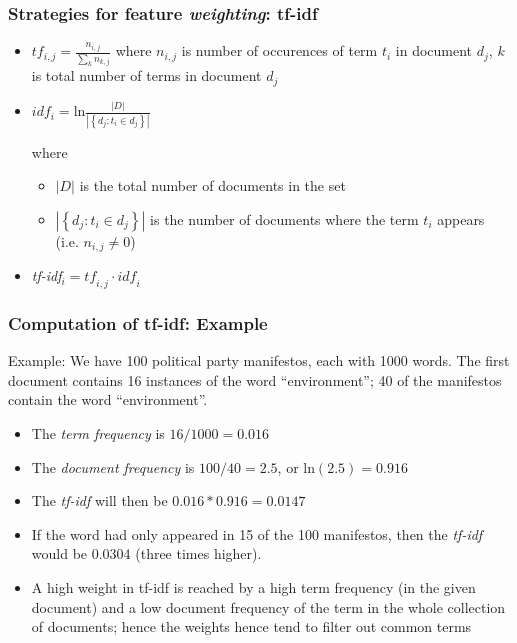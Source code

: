 \documentclass[11pt,handout]{beamer}
\begin{document}
\begin{frame}
 \frametitle{Strategies for feature \emph{weighting}: tf-idf}
 \begin{itemize}
  \setlength{\itemsep}{3ex}
  \item $tf_{i,j} = \frac{n_{i,j}}{\sum_kn_{k,j}}$
        where $n_{i,j}$ is number of occurences of term $t_i$ in document
        $d_j$, $k$ is total number of terms in document $d_j$
  \item $idf_i = \mathrm{ln} \frac{|D|}{|\left\{ d_j: t_i \in d_j \right\} |}$

        where
        \begin{itemize}
         \item $|D|$ is the total number of documents in the set
         \item $|\left\{ d_j: t_i \in d_j \right\} |$ is the number of
               documents where the term $t_i$ appears (i.e. $n_{i,j}\neq 0$)
        \end{itemize}

  \item \emph{tf-idf}$_i = \mathit{tf}_{i,j} \cdot \mathit{idf}_i$
 \end{itemize}
\end{frame}

\begin{frame}
 \frametitle{Computation of tf-idf: Example}
 Example: We have 100 political party manifestos, each with 1000
 words.  The first document contains 16 instances of the word
 ``environment''; 40 of the manifestos contain the word
 ``environment''.
 \vspace{2ex}
 \begin{itemize}
  \setlength{\itemsep}{1.2ex}
  \item The \emph{term frequency} is $16/1000 = 0.016$
  \item The \emph{document frequency} is $100/40 = 2.5$, or
        ln$(2.5)=0.916$
  \item The \emph{tf-idf} will then be $0.016 * 0.916 = 0.0147$
  \item \pause If the word had only appeared in 15 of the 100 manifestos,
        then the \emph{tf-idf} would be 0.0304 (three times higher).
  \item \pause A high weight in tf-idf is reached by a high term frequency
        (in the given document) and a low document frequency of the term
        in the whole collection of documents; hence the \alert{weights hence tend to
        filter out common terms}
 \end{itemize}
\end{frame}
\end{document}
